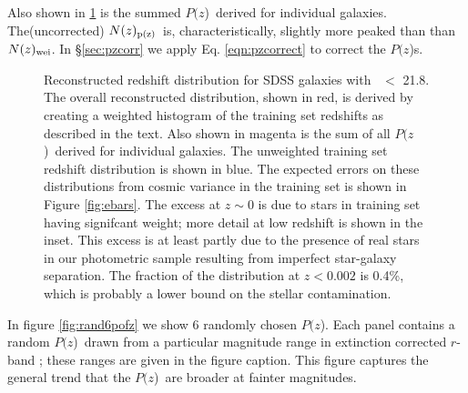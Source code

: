 \documentclass[preprint]{aastex}
\newcommand{\rmax}{21.8}
\newcommand{\pofz}{$P(z$)}
\newcommand{\nwei}{N(z)_{\rm wei}}
\newcommand{\npz}{N(z)_{\rm p(z)}}
\begin{document}
Also shown in \ref{fig:pofz} is the summed \pofz\ derived for individual
galaxies.  The(uncorrected) $\npz$\ is, characteristically, slightly more peaked than
than $\nwei$.
In \S \ref{sec:pzcorr} we apply Eq. \ref{eqn:pzcorrect} to correct the \pofz s.

\begin{figure}[p] \centering

    \caption{Reconstructed redshift distribution for SDSS galaxies with \rmag\
    $ < $ \rmax.  The overall reconstructed distribution, shown in red, is
    derived by creating a weighted histogram of the training set redshifts as
    described in the text.  Also shown in magenta is the sum of all \pofz\
    derived for individual galaxies.  The unweighted training set redshift
    distribution is shown in blue.  The expected errors on these distributions
    from cosmic variance in the training set is shown in Figure
    \ref{fig:ebars}. The excess at $z \sim 0$ is due to stars in training set
    having signifcant weight; more detail at low redshift is shown in the
    inset.  This excess is at least partly due to the presence of real stars in
    our photometric sample resulting from imperfect star-galaxy separation.
    The fraction of the distribution at $z < 0.002$ is 0.4\%, which is probably
    a lower bound on the stellar contamination.  \label{fig:pofz}}

    \vspace{2em}
\end{figure}

In figure \ref{fig:rand6pofz} we show 6 randomly chosen \pofz.  Each panel
contains a random \pofz\ drawn from a particular magnitude range in extinction
corrected $r$-band \cmodelmag; these ranges are given in the figure caption.
This figure captures the general trend that the \pofz\ are broader at
fainter magnitudes.
\end{document}
